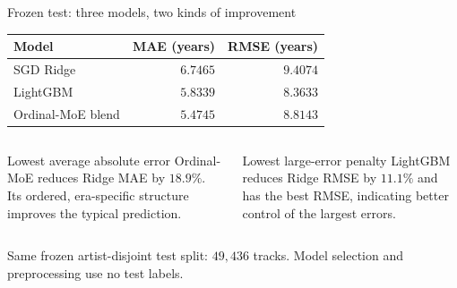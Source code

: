 \begin{frame}{Frozen test: three models, two kinds of improvement}

\begin{center}
\setlength{\tabcolsep}{12pt}
\begin{tabular}{l r r}
	\textbf{Model} & \textbf{MAE (years)} & \textbf{RMSE (years)} \\
	\hline
	SGD Ridge & $6.7465$ & $9.4074$ \\
	LightGBM & $5.8339$ & $\mathbf{8.3633}$ \\
	Ordinal-MoE blend & $\mathbf{5.4745}$ & $8.8143$ \\
\end{tabular}
\end{center}

\medskip

\begin{columns}[T,onlytextwidth]
	\begin{block}{Lowest average absolute error}
	Ordinal-MoE reduces Ridge MAE by $18.9\%$. Its ordered, era-specific
	structure improves the typical prediction.
	\end{block}

	\begin{block}{Lowest large-error penalty}
	LightGBM reduces Ridge RMSE by $11.1\%$ and has the best RMSE, indicating
	better control of the largest errors.
	\end{block}
\end{columns}

\medskip
{\small Same frozen artist-disjoint test split: $49{,}436$ tracks. Model
selection and preprocessing use no test labels.}

\end{frame}

